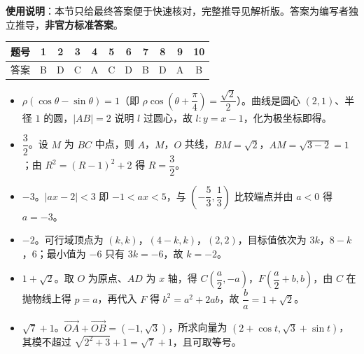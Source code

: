 
\begin{gknotice}
\textbf{使用说明}：本节只给最终答案便于快速核对，完整推导见解析版。答案为编写者独立推导，\textbf{非官方标准答案}。
\end{gknotice}

\begin{center}\begin{tabular}{ccccccccccc}
\toprule
题号 & 1 & 2 & 3 & 4 & 5 & 6 & 7 & 8 & 9 & 10 \\
\midrule
答案 & B & D & C & A & C & D & B & D & A & B \\
\bottomrule
\end{tabular}\end{center}

\begin{itemize}[leftmargin=2.6em]
  \item[\textbf{11.}] $\rho(\cos\theta-\sin\theta)=1$（即 $\rho\cos\left(\theta+\dfrac\pi4\right)=\dfrac{\sqrt2}2$）。曲线是圆心 $(2,1)$、半径 $1$ 的圆，$|AB|=2$ 说明 $l$ 过圆心，故 $l:y=x-1$，化为极坐标即得。
  \item[\textbf{12.}] $\dfrac32$。设 $M$ 为 $BC$ 中点，则 $A$，$M$，$O$ 共线，$BM=\sqrt2$，$AM=\sqrt{3-2}=1$；由 $R^2=(R-1)^2+2$ 得 $R=\dfrac32$。
  \item[\textbf{13.}] $-3$。$|ax-2|<3$ 即 $-1<ax<5$，与 $\left(-\dfrac53,\dfrac13\right)$ 比较端点并由 $a<0$ 得 $a=-3$。
  \item[\textbf{14.}] $-2$。可行域顶点为 $(k,k)$，$(4-k,k)$，$(2,2)$，目标值依次为 $3k$，$8-k$，$6$；最小值为 $-6$ 只有 $3k=-6$，故 $k=-2$。
  \item[\textbf{15.}] $1+\sqrt2$。取 $O$ 为原点、$AD$ 为 $x$ 轴，得 $C\left(\dfrac a2,-a\right)$，$F\left(\dfrac a2+b,b\right)$，由 $C$ 在抛物线上得 $p=a$，再代入 $F$ 得 $b^2=a^2+2ab$，故 $\dfrac ba=1+\sqrt2$。
  \item[\textbf{16.}] $\sqrt7+1$。$\overrightarrow{OA}+\overrightarrow{OB}=(-1,\sqrt3)$，所求向量为 $(2+\cos t,\sqrt3+\sin t)$，其模不超过 $\sqrt{2^2+3}+1=\sqrt7+1$，且可取等号。
\end{itemize}

